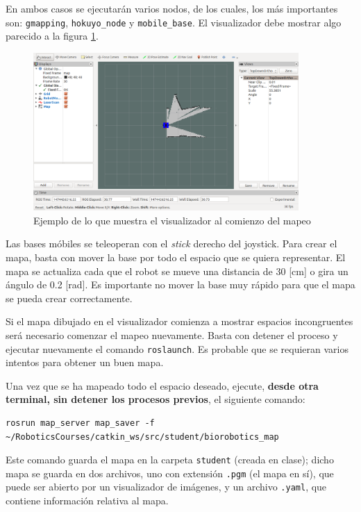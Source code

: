 \documentclass[letterpaper,12pt]{article}
\begin{document}
En ambos casos se ejecutarán varios nodos, de los cuales, los más importantes son: \texttt{gmapping}, \texttt{hokuyo\_node} y \texttt{mobile\_base}. El visualizador debe mostrar algo parecido a la figura \ref{fig:rviz}.

\begin{figure}
\centering
\includegraphics[width=0.9\textwidth]{Figures/rviz_mapping.png}
\caption{Ejemplo de lo que  muestra el visualizador al comienzo del mapeo}
\label{fig:rviz}
\end{figure}

Las bases móbiles se teleoperan con el \textit{stick} derecho del joystick. Para crear el mapa, basta con mover la base por todo el espacio que se quiera representar. El mapa se actualiza cada que el robot se mueve una distancia de 30 [cm] o gira un ángulo de 0.2 [rad]. Es importante no mover la base muy rápido para que el mapa se pueda crear correctamente. 

Si el mapa dibujado en el visualizador comienza a mostrar espacios incongruentes será necesario comenzar el mapeo nuevamente. Basta con detener el proceso y ejecutar nuevamente el comando \texttt{roslaunch}. Es probable que se requieran varios intentos para obtener un buen mapa. 

Una vez que se ha mapeado todo el espacio deseado, ejecute, \textbf{desde otra terminal, sin detener los procesos previos}, el siguiente comando:
\begin{verbatim}
rosrun map_server map_saver -f ~/RoboticsCourses/catkin_ws/src/student/biorobotics_map
\end{verbatim}
Este comando guarda el mapa en la carpeta \texttt{student} (creada en clase); dicho mapa se guarda en dos archivos, uno con extensión \texttt{.pgm} (el mapa en sí), que puede ser abierto por un visualizador de imágenes, y un archivo \texttt{.yaml}, que contiene información relativa al mapa. 
\end{document}
